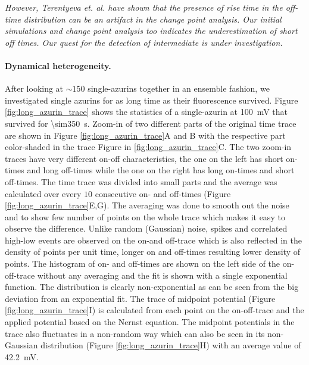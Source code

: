 \documentclass[journal=jacsat,manuscript=article]{achemso}
\begin{document}
\textit{However, Terentyeva et. al. have shown that the presence of rise time in the off-time distribution can be an artifact in the change point analysis. Our initial simulations and change point analysis too indicates the underestimation of short off times. Our quest for the detection of intermediate is under investigation.}
\paragraph*{Dynamical heterogeneity.}
After looking at ${\sim}150$ single-azurins together in an ensemble fashion, we investigated single azurins for as long time as their fluorescence survived.
Figure \ref{fig:long_azurin_trace} shows the statistics of a single-azurin at \SI{100}{\mV} that survived for \SI{\sim350}{\s}.
Zoom-in of two different parts of the original time trace are shown in Figure \ref{fig:long_azurin_trace}A and B with the respective part color-shaded in the trace Figure in \ref{fig:long_azurin_trace}C.
The two zoom-in traces have very different on-off characteristics, the one on the left has short on-times and long off-times while the one on the right has long on-times and short off-times.
The time trace was divided into small parts and the average was calculated over every $10$ consecutive on- and off-times (Figure \ref{fig:long_azurin_trace}E,G).
The averaging was done to smooth out the noise and to show few number of points on the whole trace which makes it easy to observe the difference.
Unlike random (Gaussian) noise, spikes and correlated high-low events are observed on the on-and off-trace which is also reflected in the density of points per unit time, longer on and off-times resulting lower density of points.
The histogram of on- and off-times are shown on the left side of the on-off-trace without any averaging and the fit is shown with a single exponential function.
The distribution is clearly non-exponential as can be seen from the big deviation from an exponential fit.
The trace of midpoint potential (Figure \ref{fig:long_azurin_trace}I) is calculated from each point on the on-off-trace and the applied potential based on the Nernst equation.
The midpoint potentials in the trace also fluctuates in a non-random way which can also be seen in its non-Gaussian distribution (Figure \ref{fig:long_azurin_trace}H) with an average value of \SI{42.2}{\mV}.
\end{document}
